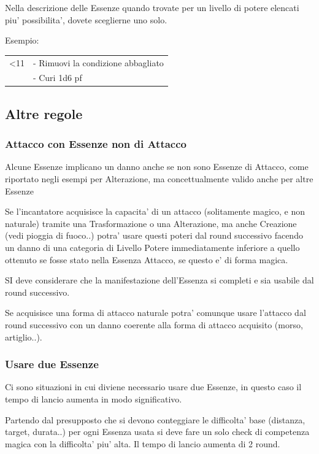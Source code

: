 \documentclass[a4paper,11pt,twoside,openany]{book}
\begin{document}
	Nella descrizione delle Essenze quando trovate per un livello di potere elencati piu' possibilita', dovete sceglierne uno solo.
	
	Esempio:
	
	\medskip
	
	\begin{tabular}{L{3cm} L{13cm}}
		\toprule
		<11 & - Rimuovi la condizione abbagliato\tabularnewline
		& - Curi 1d6 pf
	\end{tabular}
	
	\subsection{Altre regole}
	
	\label{altre-regole}
	
	\subsubsection{Attacco con Essenze non di Attacco}
	
	Alcune Essenze implicano un danno anche se non sono Essenze di Attacco, come riportato negli esempi per Alterazione, ma concettualmente valido anche per altre Essenze
	
	Se l'incantatore acquisisce la capacita' di un attacco (solitamente magico, e non naturale) tramite una Trasformazione o una Alterazione, ma anche Creazione (vedi pioggia di fuoco..) potra' usare questi poteri dal round successivo facendo un danno di una categoria di Livello Potere immediatamente inferiore a quello ottenuto se fosse stato nella Essenza Attacco, se questo e' di forma magica.
	
	SI deve considerare che la manifestazione dell'Essenza si completi e sia usabile dal round successivo.
	
	Se acquisisce una forma di attacco naturale potra' comunque usare l'attacco dal round successivo con un danno coerente alla forma di attacco acquisito (morso, artiglio..).
	
	\subsubsection{Usare due Essenze}
	
	Ci sono situazioni in cui diviene necessario usare due Essenze, in questo caso il tempo di lancio aumenta in modo significativo.
	
	Partendo dal presupposto che si devono conteggiare le difficolta' base (distanza, target, durata..) per ogni Essenza usata si deve fare un solo check di competenza magica con la difficolta' piu' alta. Il tempo di lancio aumenta di 2 round.
	
\end{document}

